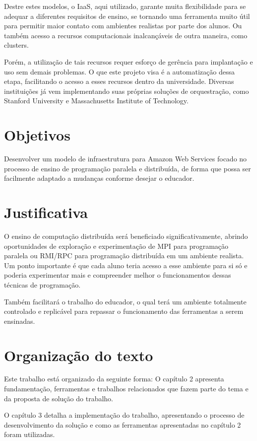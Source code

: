 \documentclass[tg]{mdtufsm}
\begin{document}
Destre estes modelos, o IaaS, aqui utilizado, garante muita flexibilidade para se adequar a diferentes requisitos de ensino, se tornando uma ferramenta muito útil para permitir maior contato com ambientes realistas por parte dos alunos. Ou também acesso a recursos computacionais inalcançáveis de outra maneira, como clusters.

Porém, a utilização de tais recursos requer esforço de gerência para implantação e uso sem demais problemas. O que este projeto visa é a automatização dessa etapa, facilitando o acesso a esses recursos dentro da universidade. Diversas instituições já vem implementando suas próprias soluções de orquestração, como Stanford University e Massachusetts Institute of Technology.


\section{Objetivos}

Desenvolver um modelo de infraestrutura para Amazon Web Services focado no processo de ensino de programação paralela e distribuída, de forma que possa ser facilmente adaptado a mudanças conforme desejar o educador.

\section{Justificativa}

O ensino de computação distribuída será beneficiado significativamente, abrindo oportunidades de exploração e experimentação de MPI para programação paralela ou RMI/RPC para programação distribuída em um ambiente realista. Um ponto importante é que cada aluno teria acesso a esse ambiente para si só e poderia experimentar mais e compreender melhor o funcionamentos dessas técnicas de programação.

Também facilitará o trabalho do educador, o qual terá um ambiente totalmente controlado e replicável para repassar o funcionamento das ferramentas a serem ensinadas.

\section{Organização do texto}

Este trabalho está organizado da seguinte forma: O capítulo 2 apresenta fundamentação, ferramentas e trabalhos relacionados que fazem parte do tema e da proposta de solução do trabalho.

O capítulo 3 detalha a implementação do trabalho, apresentando o processo de desenvolvimento da solução e como as ferramentas apresentadas no capítulo 2 foram utilizadas.
\end{document}
